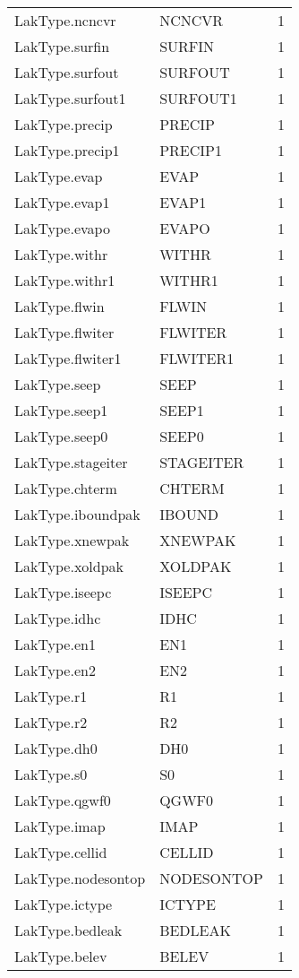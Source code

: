 \begin{longtable}{p{6cm} p{4cm} p{2cm} }
LakType.ncncvr &  NCNCVR & 1 \\ 
LakType.surfin &  SURFIN & 1 \\ 
LakType.surfout &  SURFOUT & 1 \\ 
LakType.surfout1 &  SURFOUT1 & 1 \\ 
LakType.precip &  PRECIP & 1 \\ 
LakType.precip1 &  PRECIP1 & 1 \\ 
LakType.evap &  EVAP & 1 \\ 
LakType.evap1 &  EVAP1 & 1 \\ 
LakType.evapo &  EVAPO & 1 \\ 
LakType.withr &  WITHR & 1 \\ 
LakType.withr1 &  WITHR1 & 1 \\ 
LakType.flwin &  FLWIN & 1 \\ 
LakType.flwiter &  FLWITER & 1 \\ 
LakType.flwiter1 &  FLWITER1 & 1 \\ 
LakType.seep &  SEEP & 1 \\ 
LakType.seep1 &  SEEP1 & 1 \\ 
LakType.seep0 &  SEEP0 & 1 \\ 
LakType.stageiter &  STAGEITER & 1 \\ 
LakType.chterm &  CHTERM & 1 \\ 
LakType.iboundpak &  IBOUND & 1 \\ 
LakType.xnewpak &  XNEWPAK & 1 \\ 
LakType.xoldpak &  XOLDPAK & 1 \\ 
LakType.iseepc &  ISEEPC & 1 \\ 
LakType.idhc &  IDHC & 1 \\ 
LakType.en1 &  EN1 & 1 \\ 
LakType.en2 &  EN2 & 1 \\ 
LakType.r1 &  R1 & 1 \\ 
LakType.r2 &  R2 & 1 \\ 
LakType.dh0 &  DH0 & 1 \\ 
LakType.s0 &  S0 & 1 \\ 
LakType.qgwf0 &  QGWF0 & 1 \\ 
LakType.imap &  IMAP & 1 \\ 
LakType.cellid &  CELLID & 1 \\ 
LakType.nodesontop &  NODESONTOP & 1 \\ 
LakType.ictype &  ICTYPE & 1 \\ 
LakType.bedleak &  BEDLEAK & 1 \\ 
LakType.belev &  BELEV & 1 \\ 

\end{longtable}
